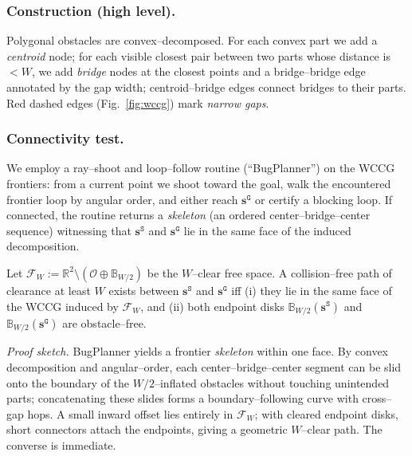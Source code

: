 \subsubsection{Construction (high level).}
Polygonal obstacles are convex–decomposed. For each convex part we add a
\emph{centroid} node; for each visible closest pair between two parts whose distance
is $<W$, we add \emph{bridge} nodes at the closest points and a bridge–bridge edge
annotated by the gap width; centroid–bridge edges connect bridges to their parts.
Red dashed edges (Fig.~\ref{fig:wccg}) mark \emph{narrow gaps}.

\subsubsection{Connectivity test.}\label{subsubsec:bugplanner}
We employ a ray–shoot and loop–follow routine (“BugPlanner”) on the WCCG frontiers:
from a current point we shoot toward the goal, walk the encountered frontier loop by
angular order, and either reach $\mathbf{s}^{\texttt{G}}$ or certify a blocking
loop. If connected, the routine returns a \emph{skeleton} (an ordered
center–bridge–center sequence) witnessing that $\mathbf{s}^{\texttt{S}}$ and
$\mathbf{s}^{\texttt{G}}$ lie in the same face of the induced decomposition.

\begin{theorem}
\label{thm:complete-W-test}
Let $\mathcal{F}_W := \mathbb{R}^2 \setminus (\mathcal{O}\oplus \mathbb{B}_{W/2})$
be the $W$–clear free space. A collision–free path of clearance at least $W$
exists between $\mathbf{s}^{\texttt{S}}$ and $\mathbf{s}^{\texttt{G}}$ iff
(i) they lie in the same face of the WCCG induced by $\mathcal{F}_W$, and
(ii) both endpoint disks $\mathbb{B}_{W/2}(\mathbf{s}^{\texttt{S}})$ and
$\mathbb{B}_{W/2}(\mathbf{s}^{\texttt{G}})$ are obstacle–free.
\end{theorem}

\noindent\textit{Proof sketch.}
BugPlanner yields a frontier \emph{skeleton} within one face.
By convex decomposition and angular–order, each center–bridge–center segment
can be slid onto the boundary of the $W/2$–inflated obstacles without touching
unintended parts; concatenating these slides forms a boundary–following curve with
cross–gap hops. A small inward offset lies entirely in $\mathcal{F}_W$; with cleared
endpoint disks, short connectors attach the endpoints, giving a geometric $W$–clear
path. The converse is immediate.

